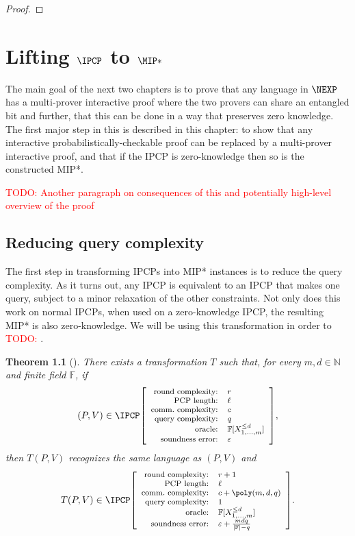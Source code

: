 \documentclass[english,12pt]{reedthesis}
\theoremstyle{plain}
\newtheorem{thm}{Theorem}[section]
\theoremstyle{definition}
\theoremstyle{remark}
\DeclarePairedDelimiter{\abs}{\lvert}{\rvert}
\newcommand{\ldipcp}[6]{%
  \ensuremath%
  \mleft[{\footnotesize\begin{array}{r l}
    \text{round complexity:} & #1 \\
    \text{PCP length:} & #2 \\
    \text{comm.\ complexity:} & #3 \\
    \text{query complexity:} & #4 \\
    \text{oracle:} & #5 \\
    \text{soundness error:} & #6
  \end{array}}\mright]%
}
\newcommand{\TODO}[1]{\textcolor{red}{TODO: #1}}
\begin{document}
\begin{proof}
\end{proof}

\chapter{Lifting $\IPCP$ to $\MIP*$}\label{chap:ipcp-to-mip}

The main goal of the next two chapters is to prove that any language in $\NEXP$
has a multi-prover interactive proof where the two provers can share an
entangled bit and further, that this can be done in a way that preserves zero
knowledge. The first major step in this is described in this chapter: to show
that any interactive probabilistically-checkable proof can be replaced by a
multi-prover interactive proof, and that if the IPCP is zero-knowledge then so
is the constructed MIP*.

\TODO{Another paragraph on consequences of this and potentially high-level
  overview of the proof}

\section{Reducing query complexity}\label{sec:reduce-queries}

The first step in transforming IPCPs into MIP* instances is to reduce the query
complexity. As it turns out, any IPCP is equivalent to an IPCP that makes one
query, subject to a minor relaxation of the other constraints. Not only does
this work on normal IPCPs, when used on a zero-knowledge IPCP, the resulting
MIP* is also zero-knowledge. We will be using this transformation in order to
\TODO{}.

\begin{thm}[{\cite[Prop.\ 9.2]{CFGS22}}]\label{thm:ipcp-one-query}
  There exists a transformation $T$ such that, for every $m, d \in \mathbb{N}$ and finite
  field $\mathbb{F}$, if
  \begin{equation*}
    (P, V) \in \IPCP\ldipcp{r}{\ell}{c}{q}{\mathbb{F}[X_{1, \ldots, m}^{\le d}]}{\varepsilon},
  \end{equation*}
  then $T(P, V)$ recognizes the same language as $(P, V)$ and
  \begin{equation*}
    T(P, V) \in \IPCP\ldipcp{r+1}{\ell}{c+\poly(m,d,q)}{1}{\mathbb{F}[X_{1, \ldots, m}^{\le d}]}{\varepsilon+\frac{mdq}{\abs{\mathbb{F}}-q}}.
  \end{equation*}
\end{thm}
\end{document}

